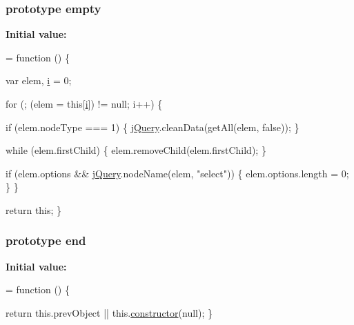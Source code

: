 \subsubsection[{\texorpdfstring{empty}{empty}}]{ {\bf prototype} empty}\hypertarget{jquery-2_82_81-vsdoc_8js_ad242f812bdc5013e0cbf15d6e4d6800a}{}\label{jquery-2_82_81-vsdoc_8js_ad242f812bdc5013e0cbf15d6e4d6800a}
{\bfseries Initial value\+:}
\begin{DoxyCode}
= \textcolor{keyword}{function} () \{
        

        var elem,
            \hyperlink{geolocation-marker_8js_a0325b7ce0988782a8032e720ef3aa411}{i} = 0;

        \textcolor{keywordflow}{for} (; (elem = \textcolor{keyword}{this}[\hyperlink{geolocation-marker_8js_a0325b7ce0988782a8032e720ef3aa411}{i}]) != null; i++) \{
            
            \textcolor{keywordflow}{if} (elem.nodeType === 1) \{
                \hyperlink{jquery-2_82_81-vsdoc_8js_add5237586d970a38a81f990e8eb28c6c}{jQuery}.cleanData(getAll(elem, \textcolor{keyword}{false}));
            \}

            
            \textcolor{keywordflow}{while} (elem.firstChild) \{
                elem.removeChild(elem.firstChild);
            \}

            
            
            \textcolor{keywordflow}{if} (elem.options && \hyperlink{jquery-2_82_81-vsdoc_8js_add5237586d970a38a81f990e8eb28c6c}{jQuery}.nodeName(elem, \textcolor{stringliteral}{"select"})) \{
                elem.options.length = 0;
            \}
        \}

        \textcolor{keywordflow}{return} \textcolor{keyword}{this};
    \}
\end{DoxyCode}
\subsubsection[{\texorpdfstring{end}{end}}]{ {\bf prototype} end}\hypertarget{jquery-2_82_81-vsdoc_8js_af2ce7c86b4e6e9d61f85745258f4ef32}{}\label{jquery-2_82_81-vsdoc_8js_af2ce7c86b4e6e9d61f85745258f4ef32}
{\bfseries Initial value\+:}
\begin{DoxyCode}
= \textcolor{keyword}{function} () \{
        

        \textcolor{keywordflow}{return} this.prevObject || this.\hyperlink{jquery-2_82_81-vsdoc_8js_ac8c7ab4467fc25f40e85c72221a1f10b}{constructor}(null);
    \}
\end{DoxyCode}
